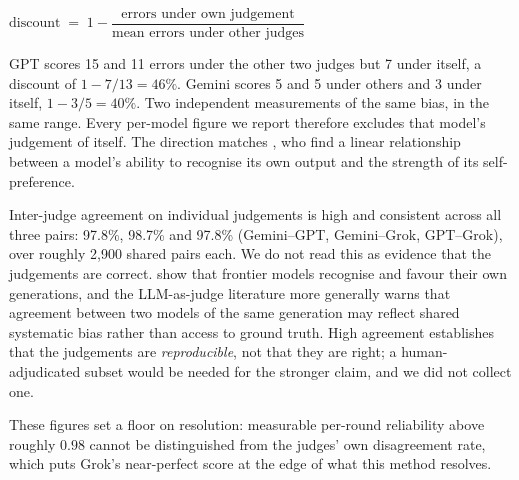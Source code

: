 \documentclass[11pt]{article}
\begin{document}
\begin{center}\small
$
\text{discount} \;=\; 1 - \dfrac{\text{errors under own judgement}}
{\text{mean errors under other judges}}
$
\end{center}

\noindent GPT scores 15 and 11 errors under the other two judges but 7 under
itself, a discount of $1 - 7/13 = 46\%$. Gemini scores 5 and 5 under others and
3 under itself, $1 - 3/5 = 40\%$. Two independent measurements of the same bias,
in the same range. Every per-model figure we report therefore excludes that
model's judgement of itself. The direction matches \citet{panickssery2024}, who
find a linear relationship between a model's ability to recognise its own
output and the strength of its self-preference.

Inter-judge agreement on individual judgements is high and consistent across
all three pairs: 97.8\%, 98.7\% and 97.8\% (Gemini--GPT, Gemini--Grok,
GPT--Grok), over roughly 2{,}900 shared pairs each. We do not read this as
evidence that the judgements are correct. \citet{panickssery2024} show that
frontier models recognise and favour their own generations, and the
LLM-as-judge literature more generally warns that agreement between two models
of the same generation may reflect shared systematic bias rather than access to
ground truth. High agreement establishes that the judgements are
\emph{reproducible}, not that they are right; a human-adjudicated subset would
be needed for the stronger claim, and we did not collect one.

These figures set a floor on resolution: measurable per-round reliability
above roughly $0.98$ cannot be distinguished from the judges' own disagreement
rate, which puts Grok's near-perfect score at the edge of what this method
resolves.
\end{document}

